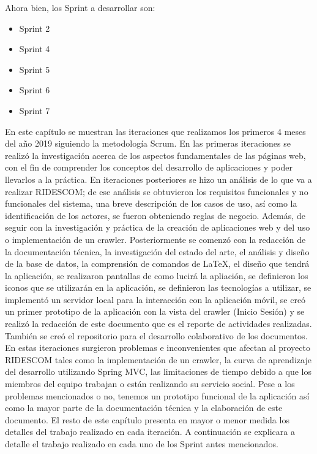 	
	

	\noindent Ahora bien, los Sprint a desarrollar son: 
	\begin{itemize}
		\item Sprint 2
		\item Sprint 4
		\item Sprint 5
		\item Sprint 6
		\item Sprint 7
	\end{itemize}
	\noindent En este capítulo se muestran las iteraciones que realizamos los primeros 4 meses del año 2019 siguiendo la metodología Scrum. En las primeras iteraciones se realizó la investigación acerca de los aspectos fundamentales de las páginas web, con el fin de comprender los conceptos del desarrollo de aplicaciones y poder llevarlos a la práctica. En iteraciones posteriores se hizo un análisis de lo que va a realizar RIDESCOM; de ese análisis se obtuvieron los requisitos funcionales y no funcionales del sistema, una breve descripción de los casos de uso, así como la identificación de los actores, se fueron obteniendo reglas de negocio. Además, de seguir con la investigación y práctica de la creación de aplicaciones web y del uso o implementación de un crawler. Posteriormente se comenzó con la redacción de la documentación técnica, la investigación del estado del arte, el análisis y diseño de la base de datos, la comprensión de comandos de LaTeX, el diseño que tendrá la aplicación, se realizaron pantallas de como lucirá la apliación, se definieron los iconos que se utilizarán en la aplicación, se definieron las tecnologías a utilizar, se implementó un servidor local para la interacción con la aplicación móvil, se creó un primer prototipo de la aplicación con la vista del crawler (Inicio Sesión) y se realizó la redacción de este documento que es el reporte de actividades realizadas. También se creó el repositorio para el desarrollo colaborativo de los documentos. En estas iteraciones surgieron problemas e inconvenientes que afectan al proyecto RIDESCOM tales como la implementación de un crawler, la curva de aprendizaje del desarrollo utilizando Spring MVC, las limitaciones de tiempo debido a que los miembros del equipo trabajan o están realizando su servicio social. Pese a los problemas mencionados o no, tenemos un prototipo funcional de la aplicación así como la mayor parte de la documentación técnica y la elaboración de este documento. El resto de este capítulo presenta en mayor o menor medida los detalles del trabajo realizado en cada iteración. A continuación se explicara a detalle el trabajo realizado en cada uno de los Sprint antes mencionados.

